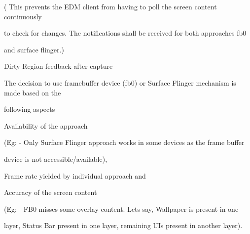 ( \-This prevents the \-E\-D\-M client from having to poll the screen content continuously

to check for changes. \-The notifications shall be received for both approaches fb0

and surface flinger.)\par



\begin{DoxyItemize}
\item \-Dirty \-Region feedback after capture\par

\end{DoxyItemize}

\-The decision to use framebuffer device (fb0) or \-Surface \-Flinger mechanism is made based on the

following aspects\par



\begin{DoxyItemize}
\item \-Availability of the approach \par

\end{DoxyItemize}

(\-Eg\-: -\/ \-Only \-Surface \-Flinger approach works in some devices as the frame buffer

device is not accessible/available),\par



\begin{DoxyItemize}
\item \-Frame rate yielded by individual approach and \par

\end{DoxyItemize}


\begin{DoxyItemize}
\item \-Accuracy of the screen content \par

\end{DoxyItemize}

(\-Eg\-: -\/ \-F\-B0 misses some overlay content. \-Lets say, \-Wallpaper is present in one

layer, \-Status \-Bar present in one layer, remaining \-U\-Is present in another layer). \par


